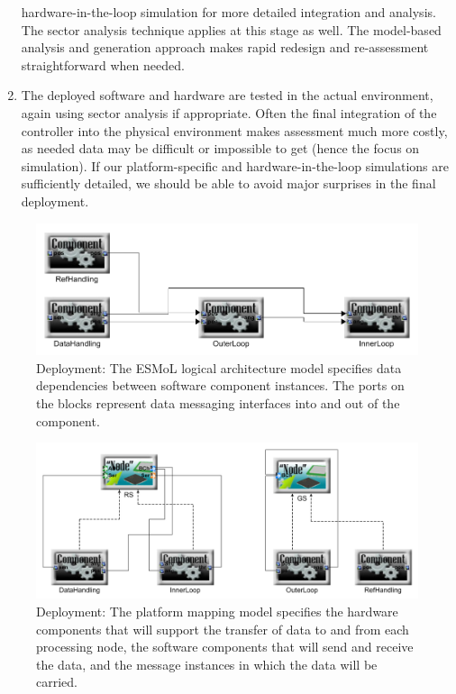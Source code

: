 \begin{enumerate}
hardware-in-the-loop simulation for more detailed integration and analysis.  The sector analysis 
technique applies at this stage as well.  The model-based analysis and generation approach makes 
rapid redesign and re-assessment straightforward when needed.
 \item The deployed software and hardware are tested in the actual environment, again using sector
analysis if appropriate. Often the final integration of the controller into the physical environment
makes assessment much more costly, as needed data may be difficult or impossible to get (hence the
focus on simulation).  If our platform-specific and hardware-in-the-loop simulations are sufficiently
detailed, we should be able to avoid major surprises in the final deployment.
\end{enumerate}


\begin{figure}[htb]
\centering
\includegraphics[width=\columnwidth]{figures/quadrotor_log_arch}
    \caption{Deployment: The ESMoL logical architecture model specifies data
dependencies between software component instances. The ports on the blocks
represent data messaging interfaces into and out of the component.}
    \label{fig:qr_log_arch}
\end{figure}

\begin{figure}[htb]
\centering
\includegraphics[width=\columnwidth]{figures/quadrotor_hw_mapping}
    \caption{Deployment: The platform mapping model specifies the hardware
components that will support the transfer of data to and from each processing
node, the software components that will send and receive the data, and the
message instances in which the data will be carried.}
    \label{fig:qr_hw_mapping}
\end{figure}

